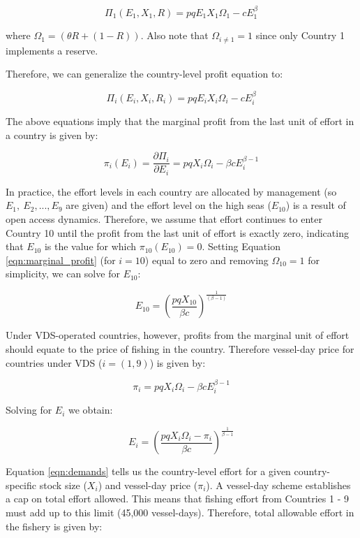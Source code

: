 \documentclass[12pt]{article}
\begin{document}
$$
\Pi_1(E_1,X_1,R) = pqE_1X_1\Omega_1-cE_1^\beta
$$

\noindent where $\Omega_1 = (\theta R + (1 - R))$. Also note that $\Omega_{i \neq 1} = 1$ since only Country 1 implements a reserve.

Therefore, we can generalize the country-level profit equation to:

$$
\Pi_i(E_i,X_i, R_i) = pqE_iX_i\Omega_i-cE_i^\beta
$$

\noindent The above equations imply that the marginal profit from the last unit of effort in a country is given by:

\begin{equation}
\pi_i(E_i) = \frac{\partial \Pi_i}{\partial E_i} = pqX_i\Omega_i - \beta cE_i^{\beta-1}
\label{eqn:marginal_profit}
\end{equation}

In practice, the effort levels in each country are allocated by management (so $E_{1},\ E_{2},...,E_{9}$ are given) and the effort level on the high seas ($E_{10}$) is a result of open access dynamics. Therefore, we assume that effort continues to enter Country 10 until the profit from the last unit of effort is exactly zero, indicating that $E_{10}$ is the value for which $\pi_{10}(E_{10})  = 0$. Setting Equation \ref{eqn:marginal_profit} (for $i = 10$) equal to zero and removing $\Omega_{10} = 1$ for simplicity, we can solve for $E_{10}$:

\begin{equation}
E_{10} = \left(\frac{pqX_{10}}{\beta c}\right)^{\frac{1}{(\beta - 1)}}
\label{eqn:effort_hs}
\end{equation}

Under VDS-operated countries, however, profits from the marginal unit of effort should equate to the price of fishing in the country. Therefore vessel-day price for countries under VDS ($i = (1, 9)$) is  given by:

$$
\pi_i = pqX_i\Omega_i - \beta c E_i ^{\beta - 1}
$$

\noindent Solving for $E_i$ we obtain:

\begin{equation}
E_i = \left(\frac{pqX_i\Omega_i - \pi_i}{\beta c }\right) ^ {\frac{1}{\beta - 1}}
\label{eqn:demands}
\end{equation}

Equation \ref{eqn:demands} tells us the country-level effort for a given country-specific stock size ($X_i$) and vessel-day price ($\pi_i$). A vessel-day scheme establishes a cap on total effort allowed. This means that fishing effort from Countries 1 - 9 must add up to this limit (45,000 vessel-days). Therefore, total allowable effort in the fishery is given by:
\end{document}
